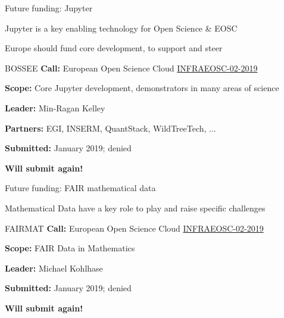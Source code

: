 \documentclass[svgnames]{beamer}
\begin{document}





\begin{frame}{Future funding: Jupyter}

  Jupyter is a key enabling technology for Open Science \& EOSC

  Europe should fund core development, to support and steer

  \bigskip

  \begin{block}{BOSSEE}
    \textbf{Call:} European Open Science Cloud \href{http://ec.europa.eu/research/participants/portal/desktop/en/opportunities/h2020/topics/infraeosc-02-2019.html}{INFRAEOSC-02-2019}

    \textbf{Scope:} Core Jupyter development, demonstrators in many areas of science
    \medskip

    \textbf{Leader:} Min-Ragan Kelley

    \textbf{Partners:} EGI, INSERM, QuantStack, WildTreeTech, ...

    \textbf{Submitted:} January 2019; denied

    \textbf{Will submit again!}
  \end{block}
\end{frame}

\begin{frame}{Future funding: FAIR mathematical data}

  Mathematical Data have a key role to play and raise specific
  challenges

  \begin{block}{FAIRMAT}
    \textbf{Call:} European Open Science Cloud \href{http://ec.europa.eu/research/participants/portal/desktop/en/opportunities/h2020/topics/infraeosc-02-2019.html}{INFRAEOSC-02-2019}

    \textbf{Scope:} FAIR Data in Mathematics
    \medskip

    \textbf{Leader:} Michael Kohlhase

    \textbf{Submitted:} January 2019; denied

    \textbf{Will submit again!}
  \end{block}
\end{frame}
\end{document}
